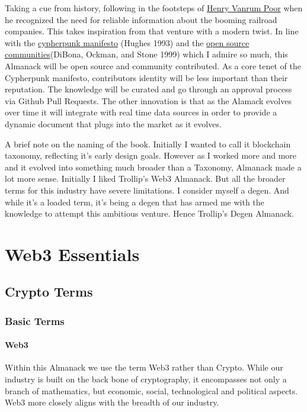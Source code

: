 \documentclass[
  letterpaper,
  DIV=11,
  numbers=noendperiod]{scrreprt}
\begin{document}
Taking a cue from history, following in the footsteps of
\href{https://en.wikipedia.org/wiki/Henry_Varnum_Poor}{Henry Vanrum
Poor} when he recognized the need for reliable information about the
booming railroad companies. This takes inspiration from that venture
with a modern twist. In line with the
\href{https://www.activism.net/cypherpunk/manifesto.html}{cypherpunk
manifesto} (Hughes 1993) and the
\href{https://www.amazon.com/Open-Sources-Voices-Source-Revolution/dp/1565925823}{open
source communities}(DiBona, Ockman, and Stone 1999) which I admire so
much, this Almanack will be open source and community contributed. As a
core tenet of the Cypherpunk manifesto, contributors identity will be
less important than their reputation. The knowledge will be curated and
go through an approval process via Github Pull Requests. The other
innovation is that as the Alamack evolves over time it will integrate
with real time data sources in order to provide a dynamic document that
plugs into the market as it evolves.

A brief note on the naming of the book. Initially I wanted to call it
blockchain taxonomy, reflecting it's early design goals. However as I
worked more and more and it evolved into something much broader than a
Taxonomy, Almanack made a lot more sense. Initially I liked Trollip's
Web3 Almanack. But all the broader terms for this industry have severe
limitations. I consider myself a degen. And while it's a loaded term,
it's being a degen that has armed me with the knowledge to attempt this
ambitious venture. Hence Trollip's Degen Almanack.

\part{Web3 Essentials}

\chapter{Crypto Terms}\label{crypto-terms}

\section{Basic Terms}\label{basic-terms}

\subsection{Web3}\label{web3}

Within this Almanack we use the term Web3 rather than Crypto. While our
industry is built on the back bone of cryptography, it encompasses not
only a branch of mathematics, but economic, social, technological and
political aspects. Web3 more closely aligns with the breadth of our
industry.
\end{document}
